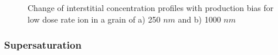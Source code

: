 \documentclass[a4paper]{article}
\begin{document}
      \begin{figure}[htb!]  %
        \centering
        \qquad
        \caption{Change of interstitial concentration profiles with production bias for low dose rate ion in a grain of a) 250 $nm$ and b) 1000 $nm$ }
        \label{figure:3D_concentrations_ion_1e-6}
      \end{figure}

    \newpage
    \subsubsection{Supersaturation} \hspace{10pt}
\end{document}
